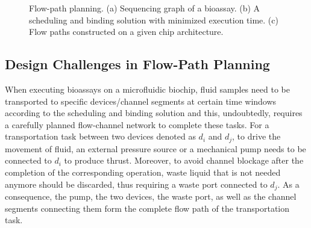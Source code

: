 \begin{figure}[t]
    \centering
    \label{ta}
    \label{tb}
    \label{tc}
	  \caption{Flow-path planning. (a) Sequencing graph of a bioassay. (b) A scheduling and binding solution with minimized execution time. (c) Flow paths constructed on a given chip architecture.}
	  \label{fig:motivation}
\end{figure}

\subsection{Design Challenges in Flow-Path Planning}\label{sec:flow_path_chan}

When executing bioassays on a microfluidic biochip, fluid samples need to be transported to specific devices/channel segments at certain time windows according to the scheduling and binding solution and this, undoubtedly, requires a carefully planned flow-channel network to complete these tasks. For a  transportation task between two devices denoted as $d_i$ and $d_j$, to drive the movement of fluid, an external pressure source or a mechanical pump needs to be connected to $d_i$ to produce thrust. Moreover, to avoid channel blockage after the completion of the corresponding operation, waste liquid that is not needed anymore should be discarded, thus requiring a waste port connected to $d_j$. As a consequence, the pump, the two devices, the waste port, as well as the channel segments connecting them form the complete flow path of the transportation task.

